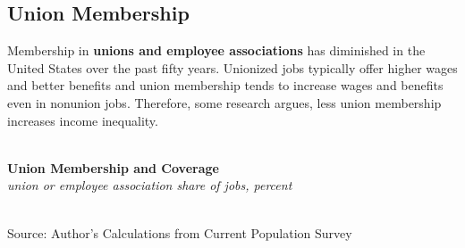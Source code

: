 \documentclass{report}
\makeatletter
\newcommand{\tbllink}[1]{\href{https://raw.githubusercontent.com/bdecon/US-chartbook/master/chartbook/data/#1}{\faTable}}
\newcommand*\short[1]{\expandafter\@gobbletwo\number\numexpr#1\relax}
\newcommand{\vtsbar}[4]{
		\addplot[ybar stacked, bar width=1.9pt, draw opacity=0, fill=#1] 
			table [x=#2, y=#3, col sep=comma]{#4};}
\newcommand{\dateaxisticks}{
		date coordinates in=x, axis line style={draw=none},
		xmax={2020-05-10},
		max space between ticks=40,	    
		xtick={{1990-01-01}, {1992-01-01}, {1994-01-01}, 
			{1996-01-01}, {1998-01-01}, {2000-01-01}, 
			{2002-01-01}, {2004-01-01}, {2006-01-01},
			{2008-01-01}, {2010-01-01}, {2012-01-01}, {2014-01-01},
		    {2016-01-01}, {2018-01-01}, {2020-01-01}},
		minor xtick={{1989-01-01}, {1991-01-01}, {1993-01-01},
			{1995-01-01}, {1997-01-01}, {1999-01-01}, 
			{2001-01-01}, {2003-01-01}, {2005-01-01}, {2007-01-01},
		    {2009-01-01}, {2011-01-01}, {2013-01-01}, {2015-01-01},
		    {2017-01-01}, {2019-01-01}},
		enlarge y limits={0.06}, enlarge x limits={0.01},
		}
\newcommand{\bbar}[2]{extra #1 ticks = {{#2}}, extra #1 tick labels = ,
		extra #1 tick style = {grid=major, grid style={thick, black!25}},}
\newcommand{\rbars}{
		\fill[color=black!10] (axis cs:{1990-07-01},\pgfkeysvalueof{/pgfplots/ymin}) rectangle 
			(axis cs:{1991-03-01}, \pgfkeysvalueof{/pgfplots/ymax});
		\fill[color=black!10] (axis cs:{2007-12-01},\pgfkeysvalueof{/pgfplots/ymin}) rectangle 
			(axis cs:{2009-07-01}, \pgfkeysvalueof{/pgfplots/ymax});
		\fill[color=black!10] (axis cs:{2001-03-01},\pgfkeysvalueof{/pgfplots/ymin}) rectangle 
			(axis cs:{2001-11-01}, \pgfkeysvalueof{/pgfplots/ymax});}
\makeatother
\begin{document}
{{{{{{{{{\begin{minipage}{0.76\textwidth}
\end{minipage}

\newpage

\begin{minipage}{0.76\textwidth}

\subsection*{\color{black!70} \seriffont Union Membership}

\small Membership in \textbf{unions and employee associations} has diminished in the United States over the past fifty years. Unionized jobs typically offer higher wages and better benefits and union membership tends to increase wages and benefits even in nonunion jobs. Therefore, some research argues, less union membership increases income inequality. \\

\\

\vspace{2mm}

\noindent \normalsize \textbf{Union Membership and Coverage}\\
\footnotesize{\textit{union or employee association share of jobs, percent}}\\
\noindent \hspace*{-2mm} \\
\footnotesize{Source: Author's Calculations from Current Population Survey} \hfill \tbllink{union.csv}\\

\end{minipage}

\vspace{4mm}

\begin{minipage}{0.43\textwidth}


\end{minipage}}}}}}}}}}
\end{document}
